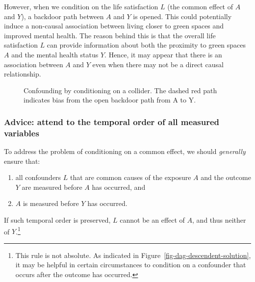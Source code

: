 \documentclass[
  singlecolumn]{article}
\providecommand{\tightlist}{%
  \setlength{\itemsep}{0pt}\setlength{\parskip}{0pt}}\usepackage{longtable,booktabs,array}
\begin{document}
However, when we condition on the life satisfaction \(L\) (the common
effect of \(A\) and \(Y\)), a backdoor path between \(A\) and \(Y\) is
opened. This could potentially induce a non-causal association between
living closer to green spaces and improved mental health. The reason
behind this is that the overall life satisfaction \(L\) can provide
information about both the proximity to green spaces \(A\) and the
mental health status \(Y\). Hence, it may appear that there is an
association between \(A\) and \(Y\) even when there may not be a direct
causal relationship.

\begin{figure}


\caption{\label{fig-dag-common-effect}Confounding by conditioning on a
collider. The dashed red path indicates bias from the open backdoor path
from A to Y.}

\end{figure}%

\subsubsection{Advice: attend to the temporal order of all measured
variables}\label{advice-attend-to-the-temporal-order-of-all-measured-variables-1}

To address the problem of conditioning on a common effect, we should
\emph{generally} ensure that:

\begin{enumerate}
\def\labelenumi{\arabic{enumi}.}
\tightlist
\item
  all confounders \(L\) that are common causes of the exposure \(A\) and
  the outcome \(Y\) are measured before \(A\) has occurred, and
\item
  \(A\) is measured before \(Y\) has occurred.
\end{enumerate}

If such temporal order is preserved, \(L\) cannot be an effect of \(A\),
and thus neither of \(Y\).\footnote{This rule is not absolute. As
  indicated in Figure~\ref{fig-dag-descendent-solution}, it may be
  helpful in certain circumstances to condition on a confounder that
  occurs after the outcome has occurred.}
\end{document}
